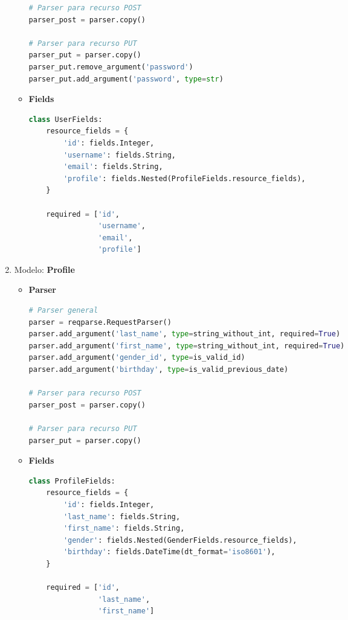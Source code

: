\documentclass[a4paper,12pt]{article}
\begin{document}
\begin{enumerate}
\begin{itemize}
\begin{lstlisting}[language=Python]
# Parser para recurso POST
parser_post = parser.copy()

# Parser para recurso PUT
parser_put = parser.copy()
parser_put.remove_argument('password')
parser_put.add_argument('password', type=str)
\end{lstlisting}
	
	\item \textbf{Fields}
	
\begin{lstlisting}[language=Python]
class UserFields:
    resource_fields = {
        'id': fields.Integer,
        'username': fields.String,
        'email': fields.String,
        'profile': fields.Nested(ProfileFields.resource_fields),
    }

    required = ['id',
                'username',
                'email',
                'profile']
\end{lstlisting}
	
\end{itemize}

\item Modelo: \textbf{Profile}

\begin{itemize}
	\item \textbf{Parser}
	
\begin{lstlisting}[language=Python]
# Parser general
parser = reqparse.RequestParser()
parser.add_argument('last_name', type=string_without_int, required=True)
parser.add_argument('first_name', type=string_without_int, required=True)
parser.add_argument('gender_id', type=is_valid_id)
parser.add_argument('birthday', type=is_valid_previous_date)

# Parser para recurso POST
parser_post = parser.copy()

# Parser para recurso PUT
parser_put = parser.copy()
\end{lstlisting}

	\item \textbf{Fields}
	
\begin{lstlisting}[language=Python]
class ProfileFields:
    resource_fields = {
        'id': fields.Integer,
        'last_name': fields.String,
        'first_name': fields.String,
        'gender': fields.Nested(GenderFields.resource_fields),
        'birthday': fields.DateTime(dt_format='iso8601'),
    }

    required = ['id',
                'last_name',
                'first_name']
\end{lstlisting}


\end{itemize}
\end{enumerate}
\end{document}
